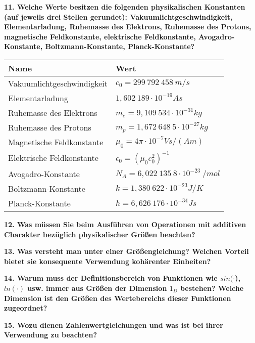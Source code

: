 \documentclass[12pt,a4paper,twoside]{book}
\newcommand{\nqu}[1]{\vspace*{10mm} \noindent \textbf{#1} \par \vspace*{1mm}}
\begin{document}
\nqu{11. Welche Werte besitzen die folgenden physikalischen Konstanten (auf jeweils drei Stellen gerundet): Vakuumlichtgeschwindigkeit, Elementarladung, Ruhemasse des Elektrons, Ruhemasse des Protons, magnetische Feldkonstante, elektrische Feldkonstante, Avogadro-Konstante, Boltzmann-Konstante, Planck-Konstante?}
\begin{table}[h]
\centering
\begin{tabular}{||l|l||}
\hline 
\rule[-1ex]{0pt}{2.5ex} Name & Wert \\ 
\hline 
\hline
\rule[-1ex]{0pt}{2.5ex} Vakuumlichtgeschwindigkeit & $c_0 = 299~792~458~m/s$ \\ 
\hline 
\rule[-1ex]{0pt}{2.5ex} Elementarladung & $1,602~189\cdot 10^{-19}As$ \\ 
\hline 
\rule[-1ex]{0pt}{2.5ex} Ruhemasse des Elektrons & $m_e =9,109~534\cdot 10^{-31}kg$ \\ 
\hline 
\rule[-1ex]{0pt}{2.5ex} Ruhemasse des Protons & $m_p =1,672~648~5\cdot 10^{-27}kg$ \\ 
\hline 
\rule[-1ex]{0pt}{2.5ex} Magnetische Feldkonstante & $\mu_0=4\pi\cdot 10^{-7} Vs/(Am)$ \\ 
\hline 
\rule[-1ex]{0pt}{2.5ex} Elektrische Feldkonstante & $\epsilon_0=(\mu_0c_0^2)^{-1}$ \\ 
\hline 
\rule[-1ex]{0pt}{2.5ex} Avogadro-Konstante & $N_A=6,022~135~8\cdot10^{-23}~/mol$ \\ 
\hline 
\rule[-1ex]{0pt}{2.5ex} Boltzmann-Konstante & $k=1,380~622\cdot10^{-23}J/K$ \\ 
\hline 
\rule[-1ex]{0pt}{2.5ex} Planck-Konstante & $h=6,626~176\cdot10^{-34}Js$ \\ 
\hline 
\end{tabular} 

\end{table}
\nqu{12. Was müssen Sie beim Ausführen von Operationen mit additiven Charakter bezüglich physikalischer Größen beachten?}

\nqu{13. Was versteht man unter einer Größengleichung? Welchen Vorteil bietet sie konsequente Verwendung kohärenter Einheiten?}

\nqu{14. Warum muss der Definitionsbereich von Funktionen wie $sin(\cdot$), $ln(\cdot)$ usw. immer aus Größen der Dimension $1_D$ bestehen? Welche Dimension ist den Größen des Wertebereichs dieser Funktionen zugeordnet?}

\nqu{15. Wozu dienen Zahlenwertgleichungen und was ist bei ihrer Verwendung zu beachten?}
\end{document}
